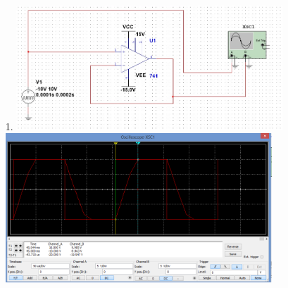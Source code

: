 \documentclass[11pt,a4paper]{article}
\begin{document}
\begin{enumerate}
  \item[1.]
		\includegraphics[width=10cm]{Task1-1Circuit}\\
		\includegraphics[width=10cm]{Task1-1-Oscilloscope}
  

\end{enumerate}
\end{document}
